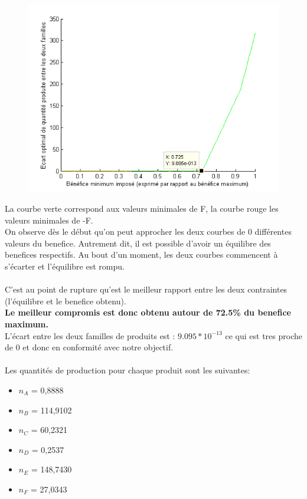 \begin{figure}[h!]
	\includegraphics[width=\textwidth]{../SourcesMatlab/graphe_resp_commercial_petit.png}
\end{figure}

La courbe verte correspond aux valeurs minimales de F, la courbe rouge les
valeurs minimales de -F.\\
On observe dès le début qu'on peut approcher les deux courbes de $0$ différentes valeurs du benefice.
Autrement dit, il est possible d'avoir un équilibre des benefices respectifs. Au bout d'un moment, les deux courbes
commencent à s'écarter et l'équilibre est rompu.\\
~\\
C'est au point de rupture qu'est le meilleur rapport entre les deux
contraintes (l'équilibre et le benefice obtenu).\\
\textbf{Le meilleur compromis est donc obtenu autour de 72.5\% du benefice maximum.}\\
L'écart entre les deux familles de produits est : $9.095*10^{-13}$ ce qui est tres proche de 0 
et donc en conformité avec notre objectif.\\
~\\ 
Les quantités de production pour chaque produit sont les suivantes:
\begin{itemize}
	\item $n_A$ = 0,8888
	\item $n_B$ = 114,9102
	\item $n_C$ = 60,2321
	\item $n_D$ = 0,2537
	\item $n_E$ = 148,7430
	\item $n_F$ = 27,0343
\end{itemize}
~\\
\begin{center}
\end{center}

